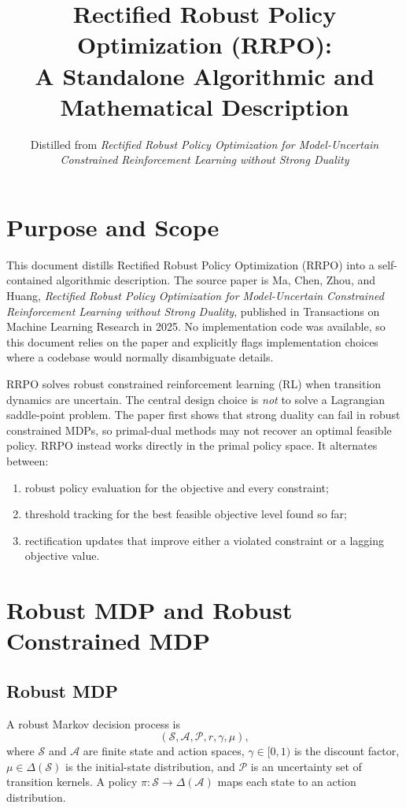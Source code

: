 \documentclass[11pt]{article}
\title{Rectified Robust Policy Optimization (RRPO):\\
A Standalone Algorithmic and Mathematical Description}
\author{Distilled from \emph{Rectified Robust Policy Optimization for Model-Uncertain Constrained Reinforcement Learning without Strong Duality}}
\date{}
\newcommand{\Sset}{\mathcal S}
\newcommand{\Aset}{\mathcal A}
\newcommand{\Pset}{\mathcal P}
\newcommand{\1}{\mathbf 1}
\begin{document}
\maketitle

\section{Purpose and Scope}
This document distills Rectified Robust Policy Optimization (RRPO) into a self-contained algorithmic description.  The source paper is Ma, Chen, Zhou, and Huang, \emph{Rectified Robust Policy Optimization for Model-Uncertain Constrained Reinforcement Learning without Strong Duality}, published in Transactions on Machine Learning Research in 2025.  No implementation code was available, so this document relies on the paper and explicitly flags implementation choices where a codebase would normally disambiguate details.

RRPO solves robust constrained reinforcement learning (RL) when transition dynamics are uncertain.  The central design choice is \emph{not} to solve a Lagrangian saddle-point problem.  The paper first shows that strong duality can fail in robust constrained MDPs, so primal-dual methods may not recover an optimal feasible policy.  RRPO instead works directly in the primal policy space.  It alternates between:
\begin{enumerate}[leftmargin=2em]
    \item robust policy evaluation for the objective and every constraint;
    \item threshold tracking for the best feasible objective level found so far;
    \item rectification updates that improve either a violated constraint or a lagging objective value.
\end{enumerate}

\section{Robust MDP and Robust Constrained MDP}
\subsection{Robust MDP}
A robust Markov decision process is
\[
    (\Sset,\Aset,\Pset,r,\gamma,\mu),
\]
where $\Sset$ and $\Aset$ are finite state and action spaces, $\gamma\in[0,1)$ is the discount factor, $\mu\in\Delta(\Sset)$ is the initial-state distribution, and $\Pset$ is an uncertainty set of transition kernels.  A policy $\pi:\Sset\to\Delta(\Aset)$ maps each state to an action distribution.
\end{document}
